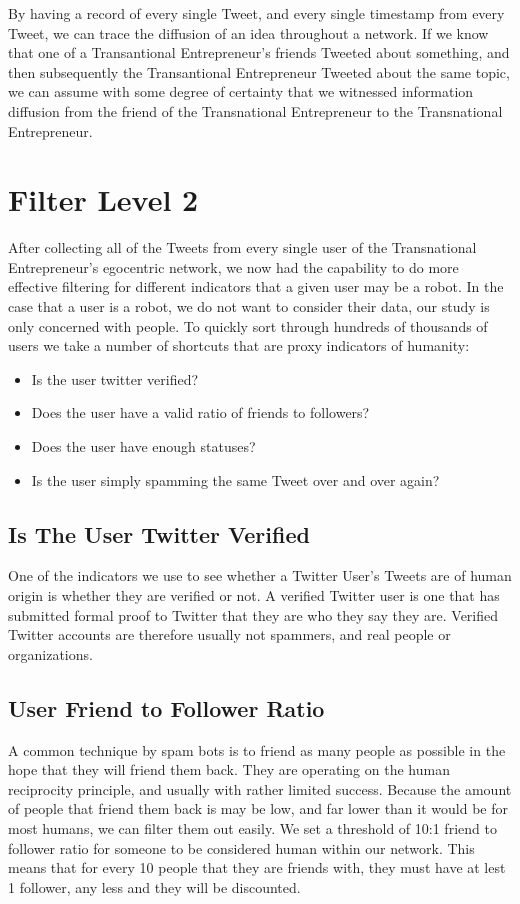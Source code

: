By having a record of every single Tweet, and every single
timestamp from every Tweet, we can trace the diffusion of an idea
throughout a network. If we know that one of a Transantional
Entrepreneur's friends Tweeted about something, and then subsequently
the Transantional Entrepreneur Tweeted about the same topic, we can
assume with some degree of certainty that we witnessed information
diffusion from the friend of the Transnational Entrepreneur to the
Transnational Entrepreneur.

\section{Filter Level 2}
After collecting all of the Tweets from every single user of the
Transnational Entrepreneur's egocentric network, we now had the
capability to do more effective filtering for different indicators
that a given user may be a robot. In the case that a user is a robot,
we do not want to consider their data, our study is only concerned
with people. To quickly sort through hundreds of thousands of users we
take a number of shortcuts that are proxy indicators of humanity:

\begin{itemize}
\item Is the user twitter verified?
\item Does the user have a valid ratio of friends to followers?
\item Does the user have enough statuses?
\item Is the user simply spamming the same Tweet over and over again?
\end{itemize}

\subsection{Is The User Twitter Verified}
One of the indicators we use to see whether a Twitter User's Tweets
are of human origin is whether they are verified or not. A verified
Twitter user is one that has submitted formal proof to Twitter that
they are who they say they are. Verified Twitter accounts are
therefore usually not spammers, and real people or organizations.

\subsection{User Friend to Follower Ratio}
A common technique by spam bots is to friend as many people as
possible in the hope that they will friend them back. They are
operating on the human reciprocity principle, and usually with rather
limited success. Because the amount of people that friend them back is
may be low, and far lower than it would be for most humans, we can
filter them out easily. We set a threshold of 10:1 friend to follower
ratio for someone to be considered human within our network. This
means that for every 10 people that they are friends with, they must
have at lest 1 follower, any less and they will be discounted.

